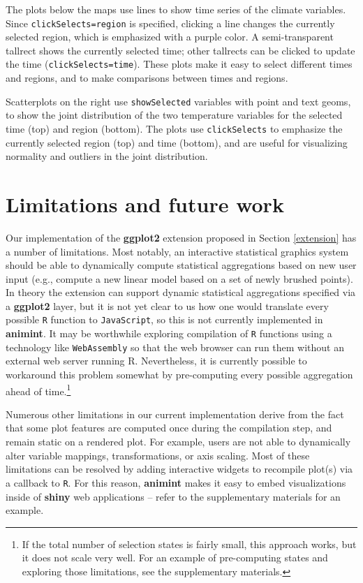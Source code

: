 \documentclass[12pt,]{article}
\let\rmarkdownfootnote\footnote%
\def\footnote{\protect\rmarkdownfootnote}
\theoremstyle{definition}
\theoremstyle{definition}
\theoremstyle{definition}
\theoremstyle{remark}
\begin{document}
The plots below the maps use lines to show time series of the climate
variables. Since \texttt{clickSelects=region} is specified, clicking a
line changes the currently selected region, which is emphasized with a
purple color. A semi-transparent tallrect shows the currently selected
time; other tallrects can be clicked to update the time
(\texttt{clickSelects=time}). These plots make it easy to select
different times and regions, and to make comparisons between times and
regions.

Scatterplots on the right use \texttt{showSelected} variables with point
and text geoms, to show the joint distribution of the two temperature
variables for the selected time (top) and region (bottom). The plots use
\texttt{clickSelects} to emphasize the currently selected region (top)
and time (bottom), and are useful for visualizing normality and outliers
in the joint distribution.

\hypertarget{limitations}{%
\section{Limitations and future work}\label{limitations}}

Our implementation of the \textbf{ggplot2} extension proposed in Section
\ref{extension} has a number of limitations. Most notably, an
interactive statistical graphics system should be able to dynamically
compute statistical aggregations based on new user input (e.g., compute
a new linear model based on a set of newly brushed points). In theory
the extension can support dynamic statistical aggregations specified via
a \textbf{ggplot2} layer, but it is not yet clear to us how one would
translate every possible \texttt{R} function to \texttt{JavaScript}, so
this is not currently implemented in \textbf{animint}. It may be
worthwhile exploring compilation of \texttt{R} functions using a
technology like \texttt{WebAssembly} so that the web browser can run
them without an external web server running R. Nevertheless, it is
currently possible to workaround this problem somewhat by pre-computing
every possible aggregation ahead of time.\footnote{If the total 
number of selection states is fairly small, this approach works, but it does not 
scale very well. For an example of pre-computing states and exploring those limitations, 
see the supplementary materials.}

Numerous other limitations in our current implementation derive from the
fact that some plot features are computed once during the compilation
step, and remain static on a rendered plot. For example, users are not
able to dynamically alter variable mappings, transformations, or axis
scaling. Most of these limitations can be resolved by adding interactive
widgets to recompile plot(s) via a callback to \texttt{R}. For this
reason, \textbf{animint} makes it easy to embed visualizations inside of
\textbf{shiny} web applications -- refer to the supplementary materials
for an example.
\end{document}
